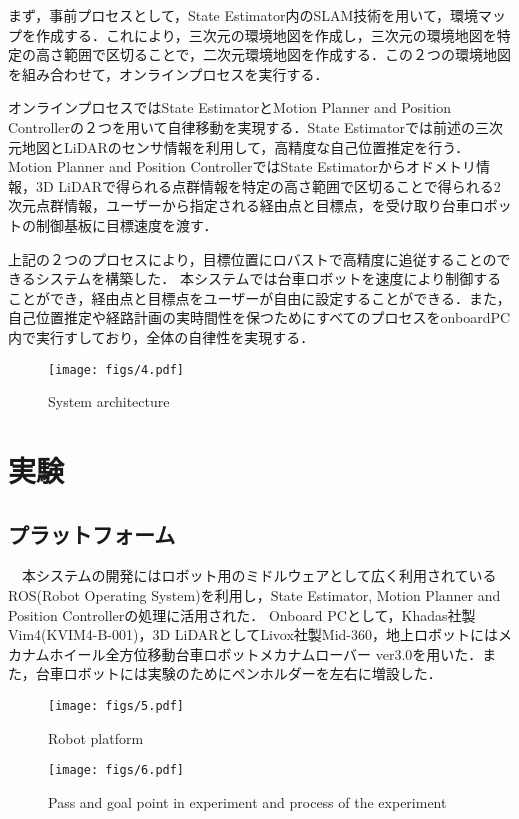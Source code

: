 まず，事前プロセスとして，State Estimator内のSLAM技術を用いて，環境マップを作成する．これにより，三次元の環境地図を作成し，三次元の環境地図を特定の高さ範囲で区切ることで，二次元環境地図を作成する．この２つの環境地図を組み合わせて，オンラインプロセスを実行する．

オンラインプロセスではState EstimatorとMotion Planner and Position Controllerの２つを用いて自律移動を実現する．State Estimatorでは前述の三次元地図とLiDARのセンサ情報を利用して，高精度な自己位置推定を行う．Motion Planner and Position ControllerではState Estimatorからオドメトリ情報，3D LiDARで得られる点群情報を特定の高さ範囲で区切ることで得られる2次元点群情報，ユーザーから指定される経由点と目標点，を受け取り台車ロボットの制御基板に目標速度を渡す．

上記の２つのプロセスにより，目標位置にロバストで高精度に追従することのできるシステムを構築した．
本システムでは台車ロボットを速度により制御することができ，経由点と目標点をユーザーが自由に設定することができる．また，自己位置推定や経路計画の実時間性を保つためにすべてのプロセスをonboardPC内で実行すしており，全体の自律性を実現する．

\begin{figure}[h]
\texttt{[image: figs/4.pdf]}
\caption{System architecture}
\label{fig:fig4}
\end{figure}

\section{実験}

\subsection{プラットフォーム}
　本システムの開発にはロボット用のミドルウェアとして広く利用されているROS(Robot Operating System)を利用し，State Estimator, Motion Planner and Position Controllerの処理に活用された．
Onboard PCとして，Khadas社製Vim4(KVIM4-B-001)，3D LiDARとしてLivox社製Mid-360，地上ロボットにはメカナムホイール全方位移動台車ロボットメカナムローバー ver3.0を用いた．また，台車ロボットには実験のためにペンホルダーを左右に増設した．

\begin{figure}[h]
\texttt{[image: figs/5.pdf]}
\caption{Robot platform}
\label{fig:fig5}
\end{figure}
\begin{figure}[h]
\texttt{[image: figs/6.pdf]}
\caption{Pass and goal point in experiment and process of the experiment}
\label{fig:fig6}
\end{figure}


